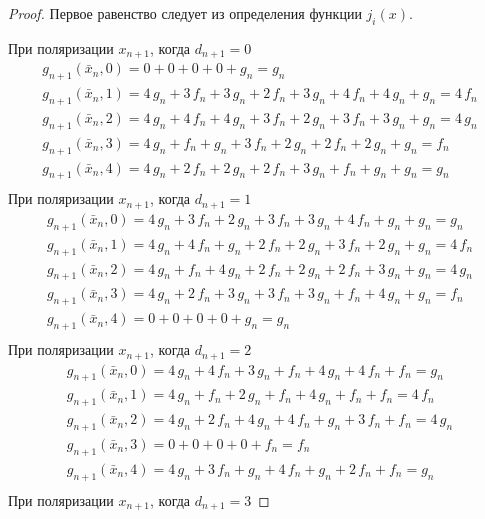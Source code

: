 \documentclass[bibliography=totoc, a4paper, 14pt]{extarticle}
\begin{document}
\begin{proof}

Первое равенство следует из определения функции $j_i(x)$.

При поляризации $x_{n+1}$, когда $d_{n+1} = 0$
$$\begin{array}{l}
g_{n+1}(\bar{x}_n, 0) = 0 + 0 + 0 + 0 + g_n = g_n \\
g_{n+1}(\bar{x}_n, 1) = 4\,g_n + 3\,f_n + 3\,g_n + 2\,f_n + 3\,g_n + 4\,f_n + 4\,g_n + g_n = 4\,f_n \\
g_{n+1}(\bar{x}_n, 2) = 4\,g_n + 4\,f_n + 4\,g_n + 3\,f_n + 2\,g_n + 3\,f_n + 3\,g_n + g_n = 4\,g_n \\
g_{n+1}(\bar{x}_n, 3) = 4\,g_n + f_n + g_n + 3\,f_n + 2\,g_n + 2\,f_n + 2\,g_n + g_n = f_n \\
g_{n+1}(\bar{x}_n, 4) = 4\,g_n + 2\,f_n + 2\,g_n + 2\,f_n + 3\,g_n + f_n + g_n + g_n = g_n \\
\end{array}$$
При поляризации $x_{n+1}$, когда $d_{n+1} = 1$
$$\begin{array}{l}
g_{n+1}(\bar{x}_n, 0) = 4\,g_n + 3\,f_n + 2\,g_n + 3\,f_n + 3\,g_n + 4\,f_n + g_n + g_n = g_n \\
g_{n+1}(\bar{x}_n, 1) = 4\,g_n + 4\,f_n + g_n + 2\,f_n + 2\,g_n + 3\,f_n + 2\,g_n + g_n = 4\,f_n \\
g_{n+1}(\bar{x}_n, 2) = 4\,g_n + f_n + 4\,g_n + 2\,f_n + 2\,g_n + 2\,f_n + 3\,g_n + g_n = 4\,g_n \\
g_{n+1}(\bar{x}_n, 3) = 4\,g_n + 2\,f_n + 3\,g_n + 3\,f_n + 3\,g_n + f_n + 4\,g_n + g_n = f_n \\
g_{n+1}(\bar{x}_n, 4) = 0 + 0 + 0 + 0 + g_n = g_n \\
\end{array}$$
При поляризации $x_{n+1}$, когда $d_{n+1} = 2$
$$\begin{array}{l}
g_{n+1}(\bar{x}_n, 0) = 4\,g_n + 4\,f_n + 3\,g_n + f_n + 4\,g_n + 4\,f_n + f_n = g_n \\
g_{n+1}(\bar{x}_n, 1) = 4\,g_n + f_n + 2\,g_n + f_n + 4\,g_n + f_n + f_n = 4\,f_n \\
g_{n+1}(\bar{x}_n, 2) = 4\,g_n + 2\,f_n + 4\,g_n + 4\,f_n + g_n + 3\,f_n + f_n = 4\,g_n \\
g_{n+1}(\bar{x}_n, 3) = 0 + 0 + 0 + 0 + f_n = f_n \\
g_{n+1}(\bar{x}_n, 4) = 4\,g_n + 3\,f_n + g_n + 4\,f_n + g_n + 2\,f_n + f_n = g_n \\
\end{array}$$
При поляризации $x_{n+1}$, когда $d_{n+1} = 3$

\end{proof}
\end{document}
